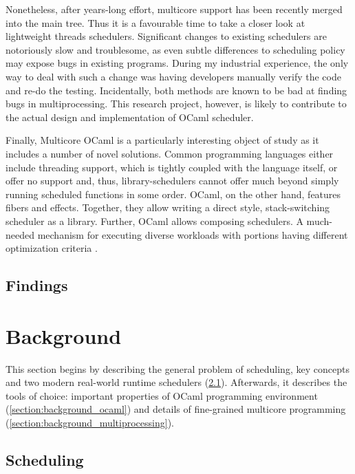 \documentclass[12pt,a4paper,twoside]{report}
\begin{document}
Nonetheless, after years-long effort, multicore support has been recently merged into the main tree. Thus it is a favourable time to take a closer look at lightweight threads schedulers. Significant changes to existing schedulers are notoriously slow and troublesome, as even subtle differences to scheduling policy may expose bugs in existing programs. During my industrial experience, the only way to deal with such a change was having developers manually verify the code and re-do the testing. Incidentally, both methods are known to be bad at finding bugs in multiprocessing. This research project, however, is likely to contribute to the actual design and implementation of OCaml scheduler. 

Finally, Multicore OCaml is a particularly interesting object of study as it includes a number of novel solutions. Common programming languages either include threading support, which is tightly coupled with the language itself, or offer no support and, thus, library-schedulers cannot offer much beyond simply running scheduled functions in some order. OCaml, on the other hand, features fibers and effects. Together, they allow writing a direct style, stack-switching scheduler as a library. Further, OCaml allows composing schedulers. A much-needed mechanism for executing diverse workloads with portions having different optimization criteria \cite{Tennenhouse89layeredmultiplexing}.


\section{Findings}
\label{section:findings}


\chapter{Background}


This section begins by describing the general problem of scheduling, key concepts and two modern real-world runtime schedulers (\ref{section:background_schedulers}). Afterwards, it describes the tools of choice: important properties of OCaml programming environment (\ref{section:background_ocaml}) and details of fine-grained multicore programming (\ref{section:background_multiprocessing}).

\section{Scheduling}
\label{section:background_schedulers}
\end{document}
